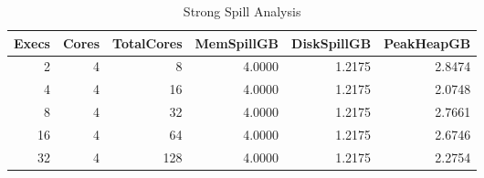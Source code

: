 \begin{table}
\caption{Strong Spill Analysis}
\label{tab:table8_strong_spill}
\begin{tabular}{rrrrrr}
\toprule
Execs & Cores & TotalCores & MemSpillGB & DiskSpillGB & PeakHeapGB \\
\midrule
2 & 4 & 8 & 4.0000 & 1.2175 & 2.8474 \\
4 & 4 & 16 & 4.0000 & 1.2175 & 2.0748 \\
8 & 4 & 32 & 4.0000 & 1.2175 & 2.7661 \\
16 & 4 & 64 & 4.0000 & 1.2175 & 2.6746 \\
32 & 4 & 128 & 4.0000 & 1.2175 & 2.2754 \\
\bottomrule
\end{tabular}
\end{table}
